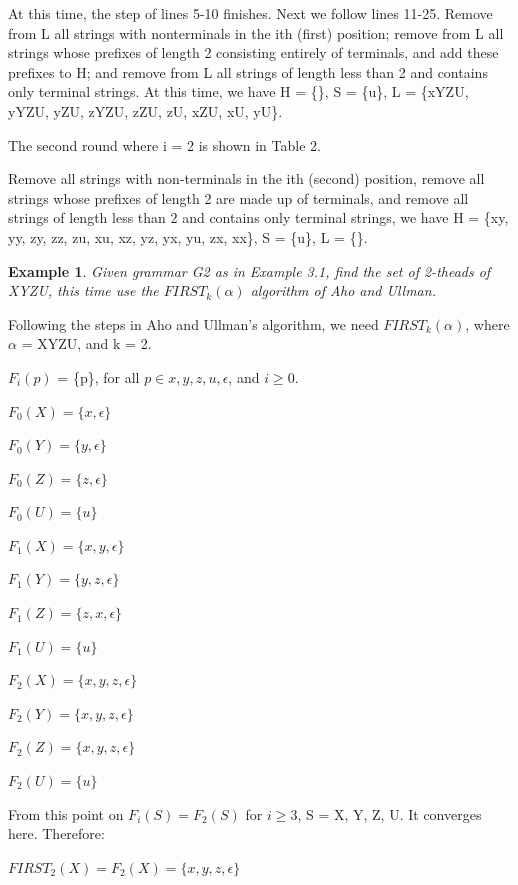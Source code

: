 \documentclass{sig-alternate-05-2015}
\newtheorem{SampleEnv}{Example}[section]
\begin{document}
At this time, the step of lines 5-10 finishes. Next we follow
lines 11-25. Remove from L all strings with nonterminals
in the ith (first) position; remove from L all
strings whose prefixes of length 2 consisting entirely of
terminals, and add these prefixes to H; and remove from L
all strings of length less than 2 and contains only terminal
strings. At this time, we have H = \{\}, S = \{u\}, L = \{xYZU,
yYZU, yZU, zYZU, zZU, zU, xZU, xU, yU\}.

\hfill

The second round where i = 2 is shown in Table 2.

Remove all strings with non-terminals in the ith (second)
position, remove all strings whose prefixes of length 2 are
made up of terminals, and remove all strings of length less
than 2 and contains only terminal strings, we have H = \{xy,
yy, zy, zz, zu, xu, xz, yz, yx, yu, zx, xx\}, S = \{u\}, L = \{\}.

\begin{SampleEnv}

Given grammar G2 as in Example 3.1, find
the set of 2-theads of XYZU, this time use the $FIRST_k(\alpha)$
algorithm of Aho and Ullman.
\end{SampleEnv}

Following the steps in Aho and Ullman's algorithm, we
need $FIRST_k(\alpha)$, where $\alpha$ = XYZU, and k = 2.

$F_i(p)$ = \{p\}, for all $p \in {x, y, z, u, \epsilon}$, and $i \geq 0$.

$F_0(X) = \{x, \epsilon\}$

$F_0(Y) = \{y, \epsilon\}$

$F_0(Z) = \{z, \epsilon\}$

$F_0(U) = \{u\}$

$F_1(X) = \{x, y, \epsilon\}$

$F_1(Y) = \{y, z, \epsilon\}$

$F_1(Z) = \{z, x, \epsilon\}$

$F_1(U) = \{u\}$

$F_2(X) = \{x, y, z, \epsilon\}$

$F_2(Y) = \{x, y, z, \epsilon\}$

$F_2(Z) = \{x, y, z, \epsilon\}$

$F_2(U) = \{u\}$

\hfill

From this point on $F_i(S) = F_2(S)$ for $i \geq 3$, S = X, Y, Z,
U. It converges here. Therefore:

$FIRST_2(X) = F_2(X) = \{x, y, z, \epsilon\}$
\end{document}
